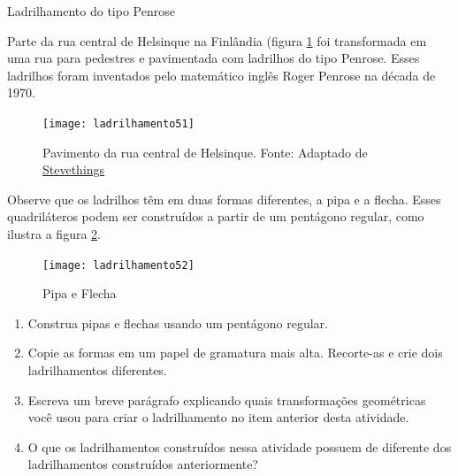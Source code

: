 \begin{task}{Ladrilhamento do tipo Penrose}\label{at_outros2}

Parte da rua central de Helsinque na Finlândia (figura \ref{pen1} foi transformada em uma rua para pedestres e pavimentada com ladrilhos do tipo Penrose. Esses ladrilhos foram inventados pelo matemático inglês Roger Penrose na década de 1970.

\begin{figure}[H]
	\centering
	\texttt{[image: ladrilhamento51]}
\label{pen1}
\caption{Pavimento da rua central de Helsinque. Fonte: Adaptado de  \href{https://stevethings.wordpress.com/2015/12/21/penrose-tiling/} {Stevethings} }
\end{figure}

Observe que os ladrilhos têm em duas formas diferentes, a pipa e a flecha. Esses quadriláteros podem ser construídos a partir de um pentágono regular, como ilustra a figura \ref{pen2}.

	\begin{figure}[H]
	\centering
	\texttt{[image: ladrilhamento52]}
\label{pen2}
\caption{Pipa e Flecha}
	\end{figure}
	
	\begin{enumerate}
		\item Construa pipas e flechas usando um pentágono regular.
		\item Copie as formas em um papel de gramatura mais alta. Recorte-as e crie dois ladrilhamentos diferentes.
		\item Escreva um breve parágrafo explicando quais transformações geométricas você usou para criar o ladrilhamento no item anterior desta atividade. 
		\item O que os ladrilhamentos construídos nessa atividade possuem de diferente dos ladrilhamentos construídos anteriormente?
	\end{enumerate}
	
\end{task}


